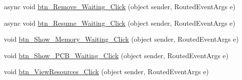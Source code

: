 \begin{DoxyCompactItemize}
\item 
async void \hyperlink{class_c_p_u___o_s___simulator_1_1_operating_system_main_window_a7f77ab2dd3fbf2a63d105a5d8e3848da}{btn\+\_\+\+Remove\+\_\+\+Waiting\+\_\+\+Click} (object sender, Routed\+Event\+Args e)
\item 
async void \hyperlink{class_c_p_u___o_s___simulator_1_1_operating_system_main_window_ab52dcc0d6c3a8c6cd2ad796aa0fe83d9}{btn\+\_\+\+Resume\+\_\+\+Waiting\+\_\+\+Click} (object sender, Routed\+Event\+Args e)
\item 
void \hyperlink{class_c_p_u___o_s___simulator_1_1_operating_system_main_window_abd6e0cf69b6d7b7e4c43f9cbac267e4b}{btn\+\_\+\+Show\+\_\+\+Memory\+\_\+\+Waiting\+\_\+\+Click} (object sender, Routed\+Event\+Args e)
\item 
void \hyperlink{class_c_p_u___o_s___simulator_1_1_operating_system_main_window_a3b62fe7240ff1ed427356b657e5e07a8}{btn\+\_\+\+Show\+\_\+\+P\+C\+B\+\_\+\+Waiting\+\_\+\+Click} (object sender, Routed\+Event\+Args e)
\item 
void \hyperlink{class_c_p_u___o_s___simulator_1_1_operating_system_main_window_a98bb78b66a99154803a598d6e1af8fe6}{btn\+\_\+\+View\+Resources\+\_\+\+Click} (object sender, Routed\+Event\+Args e)
\end{DoxyCompactItemize}
